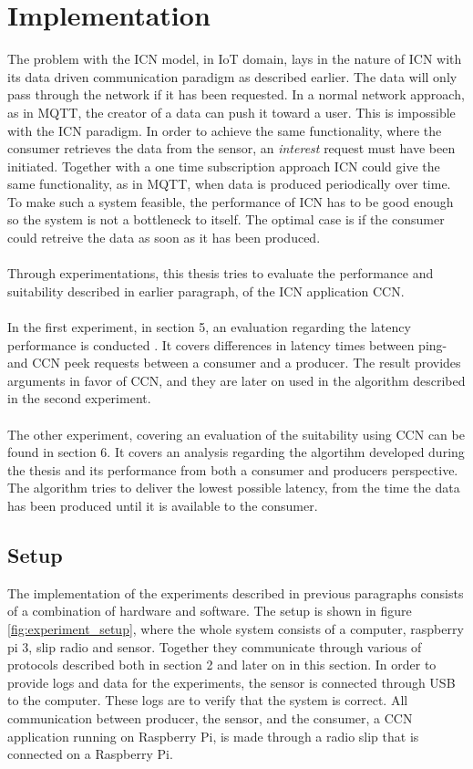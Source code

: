 \section{Implementation}
The problem with the ICN model, in IoT domain, lays in the nature of ICN with its data driven communication paradigm as described earlier. The data will only pass through the network if it has been requested. In a normal network approach, as in MQTT, the creator of a data can push it toward a user. This is impossible with the ICN paradigm. 
In order to achieve the same functionality, where the consumer retrieves the data from the sensor, an \textit{interest} request must have been initiated. Together with a one time subscription approach ICN could give the same functionality, as in MQTT, when data is produced periodically over time. To make such a system feasible, the performance of ICN has to be good enough so the system is not a bottleneck to itself. The optimal case is if the consumer could retreive the data as soon as it has been produced.\\\\
Through experimentations, this thesis tries to evaluate the performance and suitability described in earlier paragraph, of the ICN application CCN.\\\\
In the first experiment, in section 5, an evaluation regarding the latency performance is conducted . It covers differences in latency times between ping- and CCN peek requests between a consumer and a producer. The result provides arguments in favor of CCN, and they are later on used in the algorithm described in the second experiment.\\\\
The other experiment, covering an evaluation of the suitability using CCN can be found in section 6. It covers an analysis regarding the algortihm developed during the thesis and its performance from both a consumer and producers perspective. The algorithm tries to deliver the lowest possible latency, from the time the data has been produced until it is available to the consumer. 


\subsection{Setup}
The implementation of the experiments described in previous paragraphs consists of a combination of hardware and software. The setup is shown in figure \ref{fig:experiment_setup}, where the whole system consists of a computer, raspberry pi 3, slip radio and sensor. Together they communicate through various of protocols described both in section 2 and later on in this section. 
In order to provide logs and data for the experiments, the sensor is connected through USB to the computer. These logs are to verify that the system is correct. All communication between producer, the sensor, and the consumer, a CCN application running on Raspberry Pi, is made through a radio slip that is connected on a Raspberry Pi.

